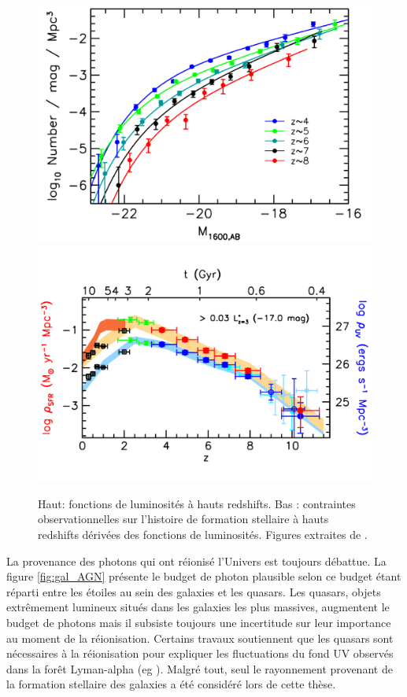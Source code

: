 \begin{figure}
		\includegraphics[width=.95\linewidth]{img/01/UV_lum_obs.pdf} 
        \includegraphics[width=.95\linewidth]{img/01/SFR_obs.pdf} 
        \caption[Contrainte SFH]{Haut: fonctions de luminosités à hauts redshifts. 
        Bas : contraintes observationnelles sur l'histoire de formation stellaire à hauts redshifts dérivées des fonctions de luminosités. 
        Figures extraites de \cite{bouwens_reionization_2015}.
 		\label{fig:obs}}
\end{figure}


La provenance des photons qui ont réionisé l'Univers est toujours débattue.
La figure \ref{fig:gal_AGN} présente le budget de photon plausible selon \cite{trac_computer_2011} ce budget étant réparti entre les étoiles au sein des galaxies et les quasars.
Les quasars, objets extrêmement lumineux situés dans les galaxies les plus massives, augmentent le budget de photons mais il subsiste toujours une incertitude sur leur importance au moment de la réionisation.
Certains travaux soutiennent que les quasars sont nécessaires à la réionisation pour expliquer les fluctuations du fond UV observés dans la forêt Lyman-alpha (eg \cite{chardin_large-scale_2017}). Malgré tout, seul le rayonnement provenant de la formation stellaire des galaxies a été considéré lors de cette thèse.


